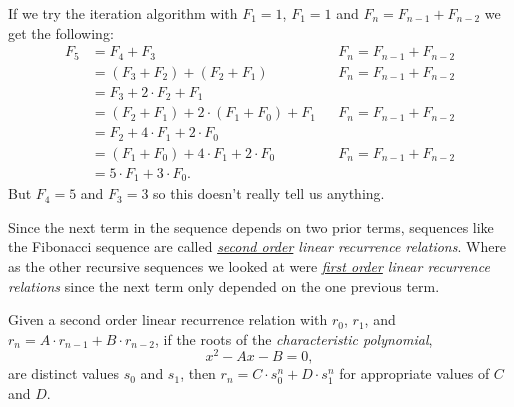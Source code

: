 \begin{exposition} If we try the iteration algorithm with \(F_1=1\), \(F_1=1\) and \(F_n=F_{n-1}+F_{n-2}\) we get the following:
    \begin{align*}
        F_5 &=F_4+F_3 && F_n=F_{n-1}+F_{n-2}\\
            &=(F_3+F_2)+(F_2+F_1) && F_n=F_{n-1}+F_{n-2}\\
            &=F_3+2\cdot F_2+F_1\\
            &=(F_2+F_1)+2\cdot (F_1+F_0)+F_1 && F_n=F_{n-1}+F_{n-2}\\
            &=F_2+4\cdot F_1+2\cdot F_0\\
            &=(F_1+F_0)+4\cdot F_1+2\cdot F_0 && F_n=F_{n-1}+F_{n-2}\\
            &=5\cdot F_1+3\cdot F_0.
    \end{align*}
    But \(F_4=5\) and \(F_3=3\) so this doesn't really tell us anything.
\end{exposition}

\begin{defn}
    Since the next term in the sequence depends on two prior terms, sequences like the Fibonacci sequence are called \emph{\underline{second order} linear recurrence relations}.  Where as the other recursive sequences we looked at were \emph{\underline{first order} linear recurrence relations} since the next term only depended on the one previous term.
\end{defn}

\begin{thm}\label{thm:distinct_roots}
Given a second order linear recurrence relation with \(r_0\), \(r_1\), and \(r_n=A\cdot r_{n-1}+B\cdot r_{n-2}\), if the roots of the \emph{characteristic polynomial},
    \[x^2-Ax-B=0,\]
are distinct values \(s_0\) and \(s_1\), then \(r_n=C\cdot s_0^n + D\cdot s_1^n\) for appropriate values of \(C\) and \(D\).
\end{thm}

